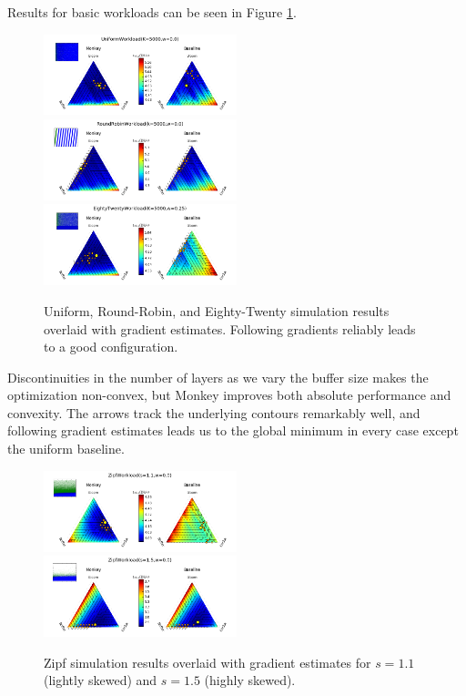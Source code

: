 \documentclass{sig-alternate-05-2015}
\begin{document}
Results for basic workloads can be seen in Figure \ref{fig:basicquiv}.

\begin{figure}[H]
\begin{center}
\includegraphics[width=0.5\textwidth]{uniformquiv1.png}
\includegraphics[width=0.5\textwidth]{robinquiv1.png}
\includegraphics[width=0.5\textwidth]{eightwenquiv2.png}
\end{center}
\caption{Uniform, Round-Robin, and Eighty-Twenty simulation results overlaid with
gradient estimates. Following gradients reliably leads to a good configuration.}
\label{fig:basicquiv}
\end{figure}

Discontinuities in the number of layers as we vary the buffer size makes the
optimization non-convex, but Monkey improves both absolute performance and
convexity. The arrows track the underlying contours remarkably well, and
following gradient estimates leads us to the global minimum in every case
except the uniform baseline.

\begin{figure}[H]
\begin{center}
\includegraphics[width=0.5\textwidth]{zipfquiv1.png}
\includegraphics[width=0.5\textwidth]{zipfquiv2.png}
\end{center}
\caption{Zipf simulation results overlaid with gradient estimates for $s=1.1$
(lightly skewed) and $s=1.5$ (highly skewed).}
\label{fig:zipfquiv}
\end{figure}
\end{document}
